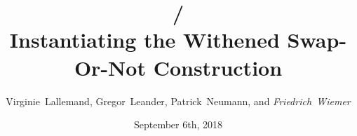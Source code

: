 \documentclass[%
    10pt,
    professionalfont,
    aspectratio=169,
]{beamer}
\title{\bison/\\ Instantiating the Withened Swap-Or-Not Construction}
\subtitle{}
\author[Friedrich~Wiemer]{Virginie~Lallemand, Gregor~Leander, Patrick~Neumann, and \emph{Friedrich~Wiemer}}
\institute{%
    Horst Görtz Institute for IT Security\\
    Ruhr-Universität Bochum
}
\date{September 6th, 2018}
\begin{document}
\begin{frame}
    \titlepage{}
\end{frame}


\end{document}
